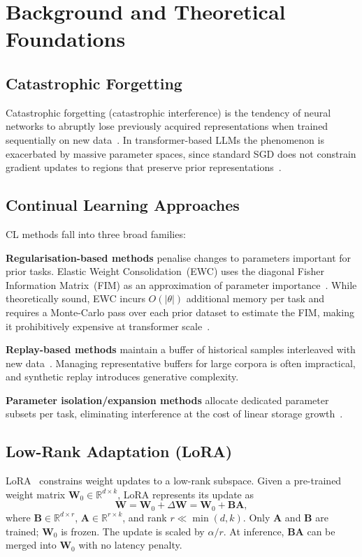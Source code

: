 \documentclass[11pt,a4paper]{article}
\begin{document}
\section{Background and Theoretical Foundations}
\label{sec:background}

\subsection{Catastrophic Forgetting}

Catastrophic forgetting (catastrophic interference) is the tendency of
neural networks to abruptly lose previously acquired representations when
trained sequentially on new data~\cite{McCloskey1989,Kirkpatrick2017}.
In transformer-based LLMs the phenomenon is exacerbated by massive
parameter spaces, since standard SGD does not constrain gradient
updates to regions that preserve prior
representations~\cite{Wang2023survey,Wu2024survey}.

\subsection{Continual Learning Approaches}

CL methods fall into three broad families:

\textbf{Regularisation-based methods} penalise changes to parameters
important for prior tasks.  Elastic Weight Consolidation~(EWC)
uses the diagonal Fisher Information Matrix~(FIM) as an approximation
of parameter importance~\cite{Kirkpatrick2017}.  While theoretically
sound, EWC incurs $O(|\theta|)$ additional memory per task and requires
a Monte-Carlo pass over each prior dataset to estimate the FIM, making
it prohibitively expensive at transformer scale~\cite{Wang2024comprehensive}.

\textbf{Replay-based methods} maintain a buffer of historical samples
interleaved with new data~\cite{Rebuffi2017}.  Managing representative
buffers for large corpora is often impractical, and synthetic replay
introduces generative complexity.

\textbf{Parameter isolation/expansion methods} allocate dedicated
parameter subsets per task, eliminating interference at the cost of
linear storage growth~\cite{Houlsby2019}.

\subsection{Low-Rank Adaptation (LoRA)}

LoRA~\cite{Hu2022LoRA} constrains weight updates to a low-rank
subspace.  Given a pre-trained weight matrix $\mathbf{W}_0 \in \mathbb{R}^{d \times k}$,
LoRA represents its update as
\begin{equation}
  \mathbf{W} = \mathbf{W}_0 + \Delta\mathbf{W}
             = \mathbf{W}_0 + \mathbf{B}\mathbf{A},
  \label{eq:lora}
\end{equation}
where $\mathbf{B} \in \mathbb{R}^{d \times r}$,
$\mathbf{A} \in \mathbb{R}^{r \times k}$, and rank
$r \ll \min(d,k)$.  Only $\mathbf{A}$ and $\mathbf{B}$ are trained;
$\mathbf{W}_0$ is frozen.  The update is scaled by $\alpha/r$.  At
inference, $\mathbf{BA}$ can be merged into $\mathbf{W}_0$ with no
latency penalty.
\end{document}
